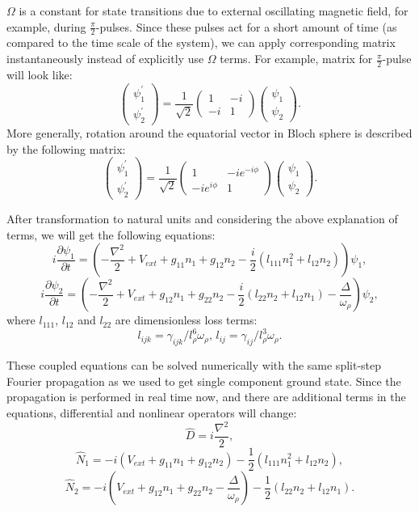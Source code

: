 \documentclass[12pt,notitlepage]{report}
\begin{document}
$\Omega$ is a constant for state transitions due to external oscillating magnetic field, for example, during $\frac{\pi}{2}$-pulses.
Since these pulses act for a short amount of time (as compared to the time scale of the system),
we can apply corresponding matrix instantaneously instead of explicitly use $\Omega$ terms.
For example, matrix for $\frac{\pi}{2}$-pulse will look like:
\[
\begin{pmatrix}
	\psi^\prime_1 \\	\psi^\prime_2
\end{pmatrix} =
\frac{1}{\sqrt{2}} \begin{pmatrix}
	1 & -i \\ -i & 1
\end{pmatrix}
\begin{pmatrix}
	\psi_1 \\ \psi_2
\end{pmatrix}.
\]
More generally, rotation around the equatorial vector in Bloch sphere is described by the following matrix:
\begin{equation}
\label{rotation_matrix}
\begin{pmatrix}
	\psi^\prime_1 \\	\psi^\prime_2
\end{pmatrix} =
\frac{1}{\sqrt{2}} \begin{pmatrix}
	1 & -i e^{-i \phi} \\ -i e^{i \phi} & 1
\end{pmatrix}
\begin{pmatrix}
	\psi_1 \\ \psi_2
\end{pmatrix}.
\end{equation}

After transformation to natural units and considering the above explanation of terms, we will get the following equations:
\[ i \frac{\partial \psi_1}{\partial t} = \left(
	-\frac{\nabla^2}{2} + V_{ext} +
	g_{11} n_1 + g_{12} n_2 - \frac{i}{2} (l_{111} n_1^2 + l_{12} n_2)
\right) \psi_1, \]
\[ i \frac{\partial \psi_2}{\partial t} = \left(
	-\frac{\nabla^2}{2} + V_{ext} +
	g_{12} n_1 + g_{22} n_2 - \frac{i}{2} (l_{22} n_2 + l_{12} n_1) -
	\frac{\Delta}{\omega_\rho}
\right) \psi_2, \]
where $l_{111}$, $l_{12}$ and $l_{22}$ are dimensionless loss terms:
\[ l_{ijk} = \gamma_{ijk} / l_\rho^6 \omega_{\rho},\, l_{ij} = \gamma_{ij} / l_\rho^3 \omega_{\rho}. \]

These coupled equations can be solved numerically with the same split-step Fourier propagation
as we used to get single component ground state.
Since the propagation is performed in real time now, and there are additional terms in the equations,
differential and nonlinear operators will change:
\[ \hat{D} = i \frac{\nabla^2}{2}, \]
\[ \hat{N}_1 = -i \left( V_{ext} + g_{11} n_1 + g_{12} n_2 \right) - \frac{1}{2} \left( l_{111} n_1^2 + l_{12} n_2 \right), \]
\[
\hat{N}_2 = -i \left( V_{ext} + g_{12} n_1 + g_{22} n_2 - \frac{\Delta}{\omega_\rho} \right) -
\frac{1}{2} \left( l_{22} n_2 + l_{12} n_1 \right).
\]
\end{document}
